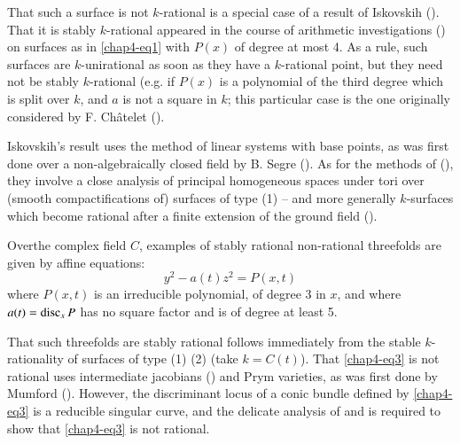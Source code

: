 That such a surface is not $k$-rational is a special case of a result
of Iskovskih (\cite{chap4-key9}). That it is stably $k$-rational
appeared in the course of arithmetic investigations
(\cite{chap4-key8}) on surfaces as in \eqref{chap4-eq1} with $P(x)$ of
degree at most 4. As a rule, such surfaces are $k$-unirational as soon
as they have a $k$-rational point, but they need not be stably
$k$-rational (e.g. if $P(x)$ is a polynomial of the third degree which
is split over $k$, and $a$ is not a square in $k$; this particular
case is the one originally considered by F. Ch\^atelet
(\cite{chap4-key5}). 

Iskovskih's result uses the method of linear systems with base points,
as was first done over a non-algebraically closed field by B. Segre
(\cite{chap4-key14}). As for the methods of (\cite{chap4-key8}), they
involve a close analysis of principal homogeneous spaces under tori
over (smooth compactifications of) surfaces of type (1) -- and more
generally $k$-surfaces which become rational after a finite extension
of the ground field (\cite{chap4-key7}).

Over\pageoriginale the complex field $C$, examples of stably rational
non-rational threefolds are given by affine equations:
\setcounter{equation}{2}
\begin{equation}
y^{2}-a(t)z^{2}=P(x,t)\label{chap4-eq3}
\end{equation}
where $P(x,t)$ is an irreducible polynomial, of degree 3 in $x$, and
where $a(t)=\operatorname{disc}_{x}P$ has no square factor and is of degree at least
5.

That such threefolds are stably rational follows immediately from the
stable $k$-rationality of surfaces of type (1) (2) (take
$k=C(t)$). That \eqref{chap4-eq3} is not rational uses intermediate
jacobians (\cite{chap4-key6}) and Prym varieties, as was first done by
Mumford (\cite{chap4-key10}). However, the discriminant locus of a
conic bundle defined by \eqref{chap4-eq3} is a reducible singular
curve, and the delicate analysis of \cite{chap4-key2}
and \cite{chap4-key3} is required to show that \eqref{chap4-eq3} is
not rational.

